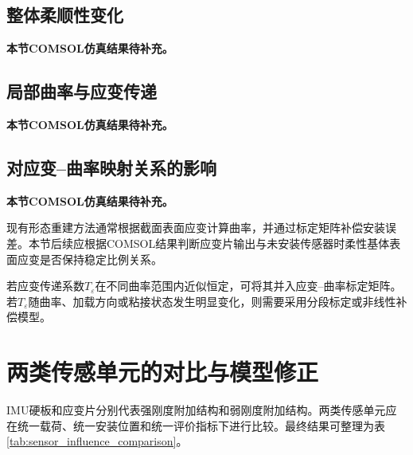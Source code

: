 \subsection{整体柔顺性变化}

\textbf{本节COMSOL仿真结果待补充。}



\subsection{局部曲率与应变传递}

\textbf{本节COMSOL仿真结果待补充。}



\subsection{对应变--曲率映射关系的影响}

\textbf{本节COMSOL仿真结果待补充。}

现有形态重建方法通常根据截面表面应变计算曲率，并通过标定矩阵补偿安装误差\cite{an2024shape}。本节后续应根据COMSOL结果判断应变片输出与未安装传感器时柔性基体表面应变是否保持稳定比例关系。

若应变传递系数$T_{\varepsilon}$在不同曲率范围内近似恒定，可将其并入应变--曲率标定矩阵。若$T_{\varepsilon}$随曲率、加载方向或粘接状态发生明显变化，则需要采用分段标定或非线性补偿模型。


\section{两类传感单元的对比与模型修正}
\label{sec:sensor_comparison_correction}

IMU硬板和应变片分别代表强刚度附加结构和弱刚度附加结构。两类传感单元应在统一载荷、统一安装位置和统一评价指标下进行比较。最终结果可整理为表\ref{tab:sensor_influence_comparison}。

